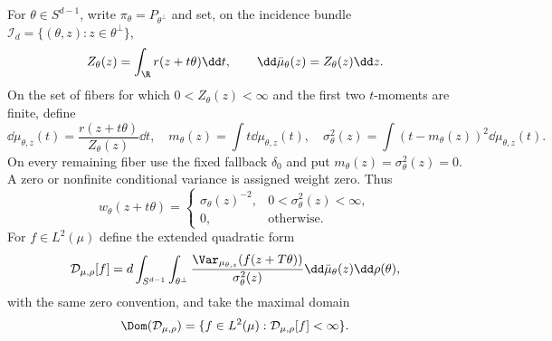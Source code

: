 \documentclass[../main.tex]{subfiles}
\begin{document}
For $\theta\in S^{d-1}$, write $\pi_\theta=P_{\theta^\perp}$ and set, on the incidence bundle
$\mathcal I_d=\{(\theta,z):z\in\theta^\perp\}$,
\begin{equation}
  Z_\theta(z)=\int_\R r(z+t\theta)\dd t,
  \qquad
  \dd\bar\mu_\theta(z)=Z_\theta(z)\dd z.
  \label{eq:sol-fiber-Z}
\end{equation}
On the set of fibers for which $0<Z_\theta(z)<\infty$ and the first two $t$-moments are finite,
define
\begin{equation}
  \dd\mu_{\theta,z}(t)=\frac{r(z+t\theta)}{Z_\theta(z)}\dd t,
  \quad
  m_\theta(z)=\int t\dd\mu_{\theta,z}(t),
  \quad
  \sigma_\theta^2(z)=\int(t-m_\theta(z))^2\dd\mu_{\theta,z}(t).
  \label{eq:sol-fiber-disintegration}
\end{equation}
On every remaining fiber use the fixed fallback $\delta_0$ and put
$m_\theta(z)=\sigma_\theta^2(z)=0$.  A zero or nonfinite conditional variance is assigned weight
zero.  Thus
\begin{equation}
  w_\theta(z+t\theta)
  =\begin{cases}
     \sigma_\theta(z)^{-2},&0<\sigma_\theta^2(z)<\infty,\\
     0,&\text{otherwise}.
   \end{cases}
  \label{eq:sol-fiber-weight}
\end{equation}
For $f\in L^2(\mu)$ define the extended quadratic form
\begin{equation}
  \mathcal D_{\mu,\rho}[f]
  =d\int_{S^{d-1}}\int_{\theta^\perp}
   \frac{\Var_{\mu_{\theta,z}}(f(z+T\theta))}
        {\sigma_\theta^2(z)}
  \dd\bar\mu_\theta(z)\dd\rho(\theta),
  \label{eq:sol-fiber-form}
\end{equation}
with the same zero convention, and take the maximal domain
\begin{equation}
  \Dom(\mathcal D_{\mu,\rho})
  =\{f\in L^2(\mu):\mathcal D_{\mu,\rho}[f]<\infty\}.
  \label{eq:sol-fiber-max-domain}
\end{equation}
\end{document}
